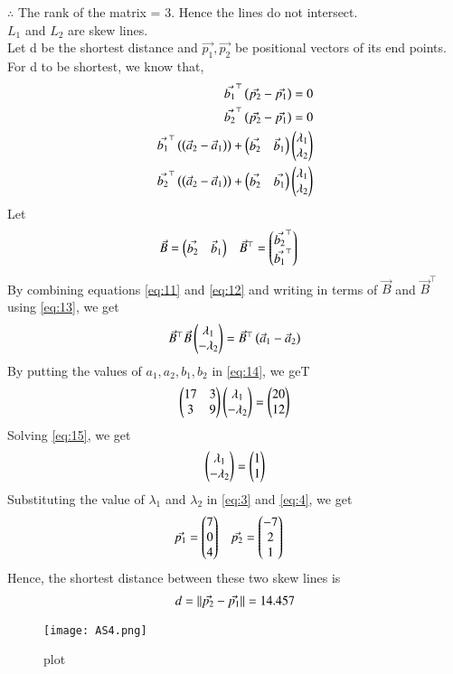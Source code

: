 \documentclass[journal,12pt,twocolumn]{IEEEtran}
\begin{document}
$\therefore$ The rank of the matrix = 3. Hence the lines do not intersect. \\                                                                                                                           $L_{1}$ and $L_{2}$ are skew lines. \\
Let d be the shortest distance and $\Vec{p_{1}}, \Vec{p_{2}}$ be positional vectors of its end points.
For d to be shortest, we know that,
\begin{align}
    \label{eq:9}
    \Vec{b_{1}}^\top\left(\Vec{p_{2}}-\Vec{p_{1}}\right)=0\\
    \label{eq:10}
     \Vec{b_{2}}^\top\left(\Vec{p_{2}}-\Vec{p_{1}}\right)=0\\
     \label{eq:11}
     \Vec{b_{1}}^\top\left(\left(\Vec{a}_{2} - \Vec{a}_{1}\right)\right)+\begin{pmatrix}\Vec{b_{2}} & \Vec{b}_{1}\end{pmatrix}\begin{pmatrix}\lambda_{1} \\ \lambda_{2}\end{pmatrix}\\
     \label{eq:12}
     \Vec{b_{2}}^\top\left(\left(\Vec{a}_{2} - \Vec{a}_{1}\right)\right)+\begin{pmatrix}\Vec{b_{2}} & \Vec{b_{1}}\end{pmatrix}\begin{pmatrix}\lambda_{1} \\ \lambda_{2}\end{pmatrix}
\end{align}
Let 
\begin{align}
\label{eq:13}
    \Vec{B}&=\begin{pmatrix}\Vec{b_{2}} & \Vec{b}_{1}\end{pmatrix} & \Vec{B}^\top&=\begin{pmatrix}\Vec{b_{2}}^\top \\ \Vec{b_{1}}^\top\end{pmatrix}
\end{align}
By combining equations \eqref{eq:11} and \eqref{eq:12} and writing in terms of $\Vec{B}$ and $\Vec{B}^\top$ using \eqref{eq:13}, we get
\begin{align}
    \label{eq:14}
    \Vec{B}^\top\Vec{B}\begin{pmatrix}\lambda_{1} \\ -\lambda_{2}\end{pmatrix}= \Vec{B}^\top\left(\Vec{a}_{1} - \Vec{a}_{2}\right)
\end{align}
By putting the values of $a_{1},a_{2},b_{1},b_{2}$ in \eqref{eq:14}, we geT
\begin{align}
    \label{eq:15}
    \begin{pmatrix}17 & 3 \\ 3 & 9\end{pmatrix}\begin{pmatrix}\lambda_{1} \\ -\lambda_{2}\end{pmatrix}=\begin{pmatrix}20 \\ 12\end{pmatrix}
\end{align}
Solving \eqref{eq:15}, we get
\begin{align}
    \label{eq:16}
    \begin{pmatrix}\lambda_{1} \\ -\lambda_{2}\end{pmatrix}=\begin{pmatrix}1 \\ 1\end{pmatrix}
\end{align}
Substituting the value of $\lambda_{1}$ and $\lambda_{2}$ in \eqref{eq:3} and \eqref{eq:4}, we get
\begin{align}
    \label{eq:17}
    \Vec{p_{1}} &= \begin{pmatrix}7 \\ 0 \\ 4 \end{pmatrix}   &    \Vec{p_{2}}&=\begin{pmatrix} -7\\ 2\\ 1\end{pmatrix}
\end{align}
Hence, the shortest distance between these two skew lines is
\begin{align}
    \label{eq:18}
    d = \lVert\Vec{p_{2}}-\Vec{p_{1}}\rVert = 14.457
\end{align}

\begin{figure}[htp]
    \centering
    \texttt{[image: AS4.png]}
    \caption{plot}
    \label{fig:my_label}
\end{figure}
\end{document}
